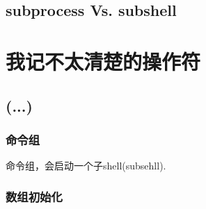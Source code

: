 \subsection{subprocess Vs. subshell}


\section{我记不太清楚的操作符}


\subsection{(...)}

\subsubsection{命令组}

命令组，会启动一个子shell(subsehll).

\subsubsection{数组初始化}


